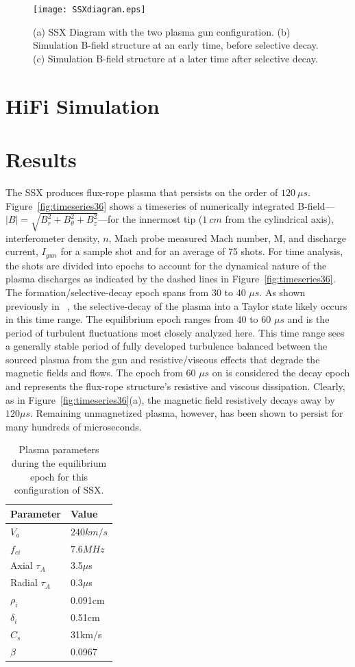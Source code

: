 \documentclass[12pt]{iopart}
\begin{document}
\begin{figure}[!htbp]
\centerline{
\texttt{[image: SSXdiagram.eps]}}
\caption{\label{fig:SSXdiagram} (a) SSX Diagram with the two plasma gun configuration. (b) Simulation B-field structure at an early time, before selective decay. (c) Simulation B-field structure at a later time after selective decay.}
\end{figure}

\section{HiFi Simulation}

\section{Results}

The SSX produces flux-rope plasma that persists on the order of $120~\mu s$. Figure~\ref{fig:timeseries36} shows a timeseries of numerically integrated B-field---$|B|=\sqrt{B_{r}^{2}+B_{\theta}^{2}+B_{z}^{2}}$---for the innermost tip ($1~cm$ from the cylindrical axis), interferometer density, $n$, Mach probe measured Mach number, M, and discharge current, $I_{gun}$ for a sample shot and for an average of 75 shots. For time analysis, the shots are divided into epochs to account for the dynamical nature of the plasma discharges as indicated by the dashed lines in Figure~\ref{fig:timeseries36}. The formation/selective-decay epoch spans from 30 to 40 $\mu s$. As shown previously in ~\cite{Gray13}, the selective-decay of the plasma into a Taylor state likely occurs in this time range. The equilibrium epoch ranges from 40 to 60 $\mu s$ and is the period of turbulent fluctuations most closely analyzed here. This time range sees a generally stable period of fully developed turbulence balanced between the sourced plasma from the gun and resistive/viscous effects that degrade the magnetic fields and flows. The epoch from 60 $\mu s$ on is considered the decay epoch and represents the flux-rope structure's resistive and viscous dissipation. Clearly, as in Figure~\ref{fig:timeseries36}(a), the magnetic field resistively decays away by $120 \mu s$. Remaining unmagnetized plasma, however, has been shown to persist for many hundreds of microseconds.

\begin{table}
\caption{\label{tab:params}Plasma parameters during the equilibrium epoch for this configuration of SSX.}
\begin{tabular}{ll}
Parameter&Value\\
\hline
$V_{a}$&$240km/s$\\
$f_{ci}$&$7.6MHz$\\
Axial $\tau_{A}$&3.5$\mu$s\\
Radial $\tau_{A}$&0.3$\mu$s\\
$\rho_{i}$&0.091cm\\
$\delta_{i}$&0.51cm\\
$C_{s}$&31km/s\\
$\beta$&0.0967\\
\end{tabular}
\end{table}
\end{document}
